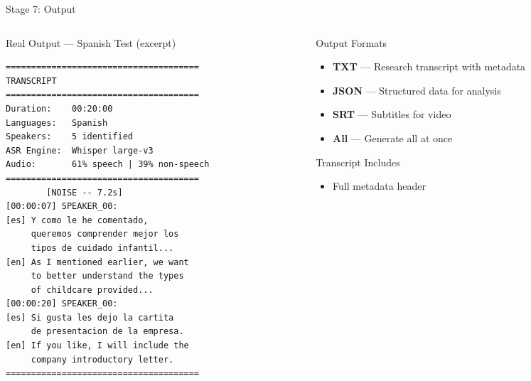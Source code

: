 \documentclass[aspectratio=169, 11pt]{beamer}
\begin{document}
\begin{frame}[fragile]{Stage 7: Output}
    \begin{columns}[T]
        \begin{column}{0.52\textwidth}
            \begin{block}{Real Output --- Spanish Test (excerpt)}
                \begin{lstlisting}[basicstyle=\ttfamily\tiny, linewidth=\columnwidth]
======================================
TRANSCRIPT
======================================
Duration:    00:20:00
Languages:   Spanish
Speakers:    5 identified
ASR Engine:  Whisper large-v3
Audio:       61% speech | 39% non-speech
======================================
        [NOISE -- 7.2s]
[00:00:07] SPEAKER_00:
[es] Y como le he comentado,
     queremos comprender mejor los
     tipos de cuidado infantil...
[en] As I mentioned earlier, we want
     to better understand the types
     of childcare provided...
[00:00:20] SPEAKER_00:
[es] Si gusta les dejo la cartita
     de presentacion de la empresa.
[en] If you like, I will include the
     company introductory letter.
======================================
                \end{lstlisting}
            \end{block}
        \end{column}
        \begin{column}{0.44\textwidth}
            \begin{block}{Output Formats}
                \scriptsize
                \begin{itemize}
                    \item[\faFileAlt] \textbf{TXT} --- Research transcript with metadata
                    \item[\faCode] \textbf{JSON} --- Structured data for analysis
                    \item[\faClosedCaptioning] \textbf{SRT} --- Subtitles for video
                    \item[\faLayerGroup] \textbf{All} --- Generate all at once
                \end{itemize}
            \end{block}
            \vspace{0.2em}
            \begin{block}{Transcript Includes}
                \scriptsize
                \begin{itemize}
                    \item Full metadata header

\end{itemize}
\end{block}
\end{column}
\end{columns}
\end{frame}
\end{document}

